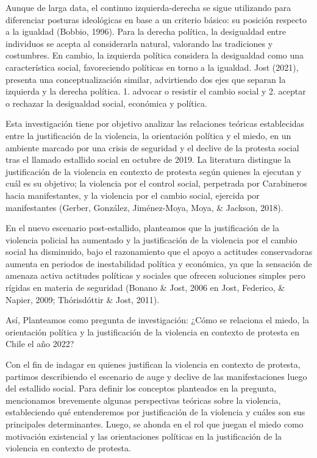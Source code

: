 \documentclass[12pt,twoside]{templates/facsothesis}
\begin{document}
Aunque de larga data, el continuo izquierda-derecha se sigue utilizando para diferenciar posturas ideológicas en base a un criterio básico: su posición respecto a la igualdad (Bobbio, 1996). Para la derecha política, la desigualdad entre individuos se acepta al considerarla natural, valorando las tradiciones y costumbres. En cambio, la izquierda política considera la desigualdad como una característica social, favoreciendo políticas en torno a la igualdad. Jost (2021), presenta una conceptualización similar, advirtiendo dos ejes que separan la izquierda y la derecha política. 1. advocar o resistir el cambio social y 2. aceptar o rechazar la desigualdad social, económica y política.

Esta investigación tiene por objetivo analizar las relaciones teóricas establecidas entre la justificación de la violencia, la orientación política y el miedo, en un ambiente marcado por una crisis de seguridad y el declive de la protesta social tras el llamado estallido social en octubre de 2019. La literatura distingue la justificación de la violencia en contexto de protesta según quienes la ejecutan y cuál es su objetivo; la violencia por el control social, perpetrada por Carabineros hacia manifestantes, y la violencia por el cambio social, ejercida por manifestantes (Gerber, González, Jiménez-Moya, Moya, \& Jackson, 2018).

En el nuevo escenario post-estallido, planteamos que la justificación de la violencia policial ha aumentado y la justificación de la violencia por el cambio social ha disminuido, bajo el razonamiento que el apoyo a actitudes conservadoras aumenta en periodos de inestabilidad política y económica, ya que la sensación de amenaza activa actitudes políticas y sociales que ofrecen soluciones simples pero rígidas en materia de seguridad (Bonano \& Jost, 2006 en Jost, Federico, \& Napier, 2009; Thórisdóttir \& Jost, 2011).

Así, Planteamos como pregunta de investigación: ¿Cómo se relaciona el miedo, la orientación política y la justificación de la violencia en contexto de protesta en Chile el año 2022?

Con el fin de indagar en quienes justifican la violencia en contexto de protesta, partimos describiendo el escenario de auge y declive de las manifestaciones luego del estallido social. Para definir los conceptos planteados en la pregunta, mencionamos brevemente algunas perspectivas teóricas sobre la violencia, estableciendo qué entenderemos por justificación de la violencia y cuáles son sus principales determinantes. Luego, se ahonda en el rol que juegan el miedo como motivación existencial y las orientaciones políticas en la justificación de la violencia en contexto de protesta.
\end{document}
